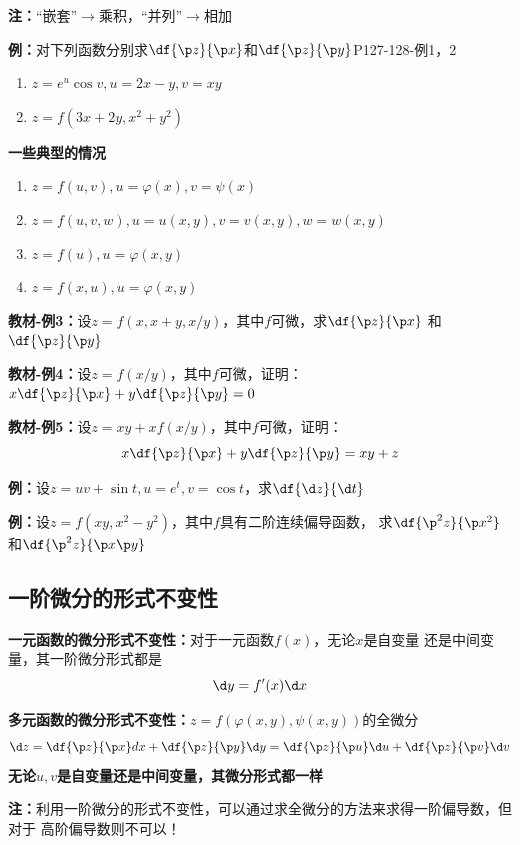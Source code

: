 {\bf 注：}“嵌套”$\to$乘积，“并列”$\to$相加

{\bf 例：}对下列函数分别求$\df{\p z}{\p x}$和$\df{\p z}{\p y}$\hfill P127-128-例1，2
\begin{enumerate}[(1)]
  \setlength{\itemindent}{1cm}
  \item $z=e^u\cos v,u=2x-y,v=xy$
  \item $z=f(3x+2y,x^2+y^2)$
\end{enumerate}

\begin{shaded}
	{\bf 一些典型的情况}
	
	\begin{enumerate}[(1)]
  	  \setlength{\itemindent}{1cm}
	  \item $z=f(u,v),u=\varphi(x),v=\psi(x)$ 
	  \item $z=f(u,v,w),u=u(x,y),v=v(x,y),w=w(x,y)$ 
	  \item $z=f(u),u=\varphi(x,y)$ 
	  \item $z=f(x,u),u=\varphi(x,y)$
	\end{enumerate}
\end{shaded}

{\bf 教材-例3：}设$z=f(x,x+y,x/y)$，其中$f$可微，求$\df{\p z}{\p x}$
和$\df{\p z}{\p y}$

{\bf 教材-例4：}设$z=f(x/y)$，其中$f$可微，证明：$x\df{\p z}{\p x}+y
\df{\p z}{\p y}=0$

{\bf 教材-例5：}设$z=xy+xf(x/y)$，其中$f$可微，证明：
$$x\df{\p z}{\p x}+y\df{\p z}{\p y}=xy+z$$

{\bf 例：}设$z=uv+\sin t,u=e^t,v=\cos t$，求$\df{\d z}{\d t}$

{\bf 例：}设$z=f(xy,x^2-y^2)$，其中$f$具有二阶连续偏导函数，
求$\df{\p^2 z}{\p x^2}$和$\df{\p^2 z}{\p x\p y}$

\subsection{一阶微分的形式不变性}

{\bf 一元函数的微分形式不变性：}对于一元函数$f(x)$，无论$x$是自变量
还是中间变量，其一阶微分形式都是
$$\d y=f'(x)\d x$$

{\bf 多元函数的微分形式不变性：}$z=f(\varphi(x,y),\psi(x,y))$的全微分
$${\d z=\df{\p z}{\p x}dx+\df{\p z}{\p y}\d y
=\df{\p z}{\p u}\d u+\df{\p z}{\p v}\d v}$$
{\bf 无论$u,v$是自变量还是中间变量，其微分形式都一样}

{\bf 注：}利用一阶微分的形式不变性，可以通过求全微分的方法来求得一阶偏导数，但对于
高阶偏导数则不可以！

